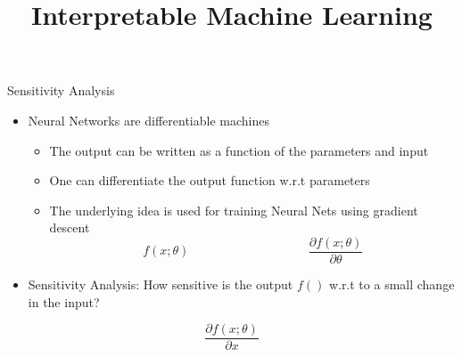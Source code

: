 \documentclass[11pt,compress,t,notes=noshow, aspectratio=169, xcolor=table]{beamer}
\title{Interpretable Machine Learning}
\date{}
\begin{document}
	\graphicspath{ {./figure/} }

\newcommand{\titlefigure}{figure/bild15}
\newcommand{\learninggoals}{
\item Basics of sensitivity analysis
\item Saliency maps for images and language
\item integrated gradients}



\begin{frame}{Sensitivity Analysis}
    \begin{itemize}
        \item Neural Networks are differentiable machines
        \begin{itemize}
            \item The output can be written as a function of the parameters and input
            \item One can differentiate the output function w.r.t parameters
            \item The underlying idea is used for training Neural Nets using gradient descent
            \begin{equation*}
                f(x;\theta)\hspace{4cm}  \frac{\partial f(x;\theta)}{\partial\theta}
            \end{equation*}
        \end{itemize}
        \item Sensitivity Analysis: How sensitive is the output $f()$ w.r.t to a small change in the
input?
    \end{itemize}
    \pause
    \bigskip
     \begin{equation*}
                 \frac{\partial f(x;\theta)}{\partial x}
            \end{equation*}
\end{frame}
	
\end{document}
